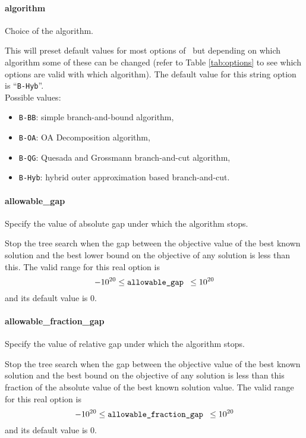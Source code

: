 
\paragraph{algorithm}
\label{algorithm} Choice of the algorithm.

       This will preset default values for most options
    of \Bonmin\ but depending on which algorithm some
of these can be changed (refer to Table \ref{tab:options} to see which options
           are valid with which algorithm).
    The default value for this string option is ``{\tt B-Hyb}''.
\\
Possible values:
\begin{itemize}
   \item {\tt B-BB}: simple branch-and-bound algorithm,
   \item {\tt B-OA}: OA Decomposition algorithm,
   \item {\tt B-QG}: Quesada and Grossmann branch-and-cut algorithm,
   \item {\tt B-Hyb}: hybrid outer approximation based branch-and-cut.
\end{itemize}


\paragraph{allowable\_gap}
\label{allowable_gap}
Specify the value of absolute gap under which the algorithm stops.

 Stop the tree search when the gap between the
objective value of the best known solution and
the best lower bound on the objective of any solution
is less than this. The valid range for this real option is
$$-10^{20} \le \hbox{\tt allowable\_gap } \le 10^{20}$$
and its default value is $0$.


\paragraph{allowable\_fraction\_gap}
\label{allowable_fraction_gap}
Specify the value of relative gap under which the algorithm stops.

 Stop the tree search when the gap between the
objective value of the best known solution and
the best bound on the objective of any solution
is less than this fraction of the absolute value
of the best known solution value. The valid range for this real option is
$$-10^{20} \le \hbox{\tt allowable\_fraction\_gap } \le 10^{20}$$
and its default value is $0$.

